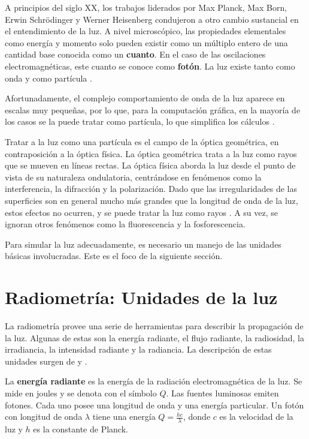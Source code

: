 A principios del siglo XX, los trabajos liderados por Max Planck, Max Born, Erwin Schrödinger y Werner Heisenberg condujeron a otro cambio sustancial en el entendimiento de la luz.
A nivel microscópico, las propiedades elementales como energía y momento solo pueden existir como un múltiplo entero de una cantidad base conocida como un \textbf{cuanto}.
En el caso de las oscilaciones electromagnéticas, este cuanto se conoce como \textbf{fotón}.
La luz existe tanto como onda y como partícula \cite{quantum-light}.

Afortunadamente, el complejo comportamiento de onda de la luz aparece en escalas muy pequeñas, por lo que, para la computación gráfica, en la mayoría de los casos se la puede tratar como partícula, lo que simplifica los cálculos \cite[p.~303]{rtr}.

Tratar a la luz como una partícula es el campo de la óptica geométrica, en contraposición a la óptica física.
La óptica geométrica trata a la luz como rayos que se mueven en líneas rectas.
La óptica física aborda la luz desde el punto de vista de su naturaleza ondulatoria, centrándose en fenómenos como la interferencia, la difracción y la polarización.
Dado que las irregularidades de las superficies son en general mucho más grandes que la longitud de onda de la luz, estos efectos no ocurren, y se puede tratar la luz como rayos \cite[p.~303]{rtr}.
A su vez, se ignoran otros fenómenos como la fluorescencia y la fosforescencia.

Para simular la luz adecuadamente, es necesario un manejo de las unidades básicas involucradas.
Este es el foco de la siguiente sección.


\section{Radiometría: Unidades de la luz}\label{sec:radiometry}

La radiometría provee una serie de herramientas para describir la propagación de la luz.
Algunas de estas son la energía radiante, el flujo radiante, la radiosidad, la irradiancia, la intensidad radiante y la radiancia.
La descripción de estas unidades surgen de \cite[p.~268]{rtr} y \cite[p.~177]{pbr}.

La \textbf{energía radiante} es la energía de la radiación electromagnética de la luz.
Se mide en joules y se denota con el símbolo $Q$.
Las fuentes luminosas emiten fotones.
Cada uno posee una longitud de onda y una energía particular.
Un fotón con longitud de onda $\lambda$ tiene una energía $Q = \frac{hc}{\lambda}$, donde $c$ es la velocidad de la luz y $h$ es la constante de Planck.


